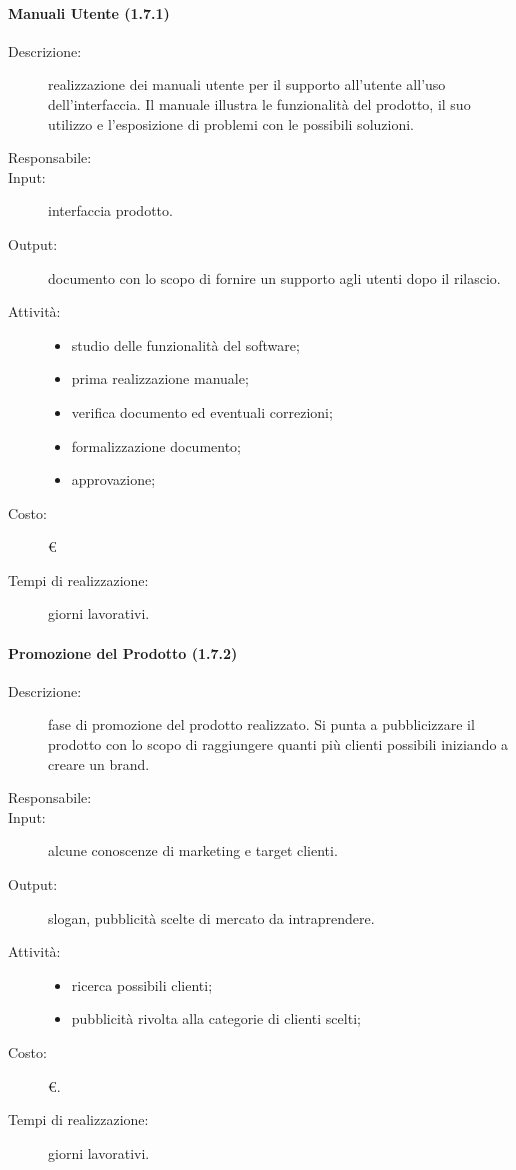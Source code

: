 \paragraph{Manuali Utente (1.7.1)}
\begin{description}
\item[Descrizione:] realizzazione dei manuali utente per il supporto all'utente all'uso dell'interfaccia. Il manuale illustra le funzionalità del prodotto, il suo utilizzo e l'esposizione di problemi con le possibili soluzioni.
\item[Responsabile:] 
\item[Input:] interfaccia prodotto.
\item[Output:] documento con lo scopo di fornire un supporto agli utenti dopo il rilascio.
\item[Attività:]
\begin{itemize}
\item studio delle funzionalità del software;
\item prima realizzazione manuale;
\item verifica documento ed eventuali correzioni;
\item formalizzazione documento;
\item approvazione;
\end{itemize}
\item[Costo:] \euro{}
\item[Tempi di realizzazione:]  giorni lavorativi.
\end{description}

\paragraph{Promozione del Prodotto (1.7.2)}
\begin{description}
\item[Descrizione:] fase di promozione del prodotto realizzato. Si punta a pubblicizzare il prodotto con lo scopo di raggiungere quanti più clienti possibili iniziando a creare un brand.
\item[Responsabile:] 
\item[Input:] alcune conoscenze di marketing e target clienti.
\item[Output:] slogan, pubblicità scelte di mercato da intraprendere.
\item[Attività:]
\begin{itemize}
\item ricerca possibili clienti;
\item pubblicità rivolta alla categorie di clienti scelti;
\end{itemize}
\item[Costo:] \euro{}.
\item[Tempi di realizzazione:]  giorni lavorativi.
\end{description}

